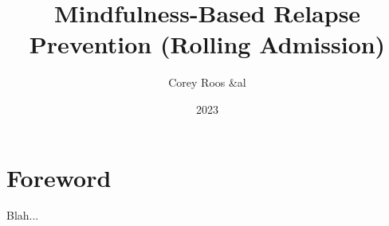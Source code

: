\documentclass[11pt,a5paper,twoside]{article}
\title{Mindfulness-Based Relapse Prevention (Rolling Admission)}
\date{2023}
\author{Corey Roos \&al \lessstressLogo}
\def\lessstressLogo{\href{https://PracticeMBRP.com}{PracticeMBRP.com}}
\begin{document}
	\thispagestyle{empty}
	\section*{Foreword}

	\vskip-3mm

	Blah...

%
%
%
%
%
%
%
	\setlength{\cftbeforesecskip}{1ex}
	\clearpage
	\tableofcontents
	\thispagestyle{empty}

	
	
\end{document}
